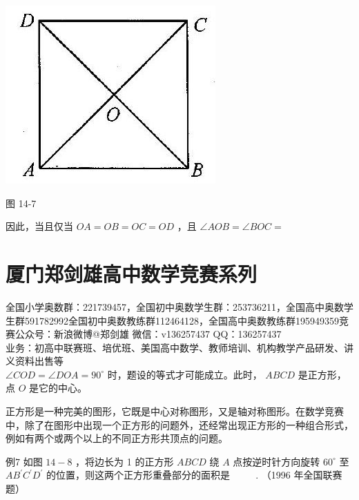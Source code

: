 \documentclass[10pt]{article}
\begin{document}
\begin{center}
\includegraphics[max width=\textwidth]{2024_10_30_2c8f45efd4a519b08e1ag-130}
\end{center}

图 14-7

因此，当且仅当 $O A=O B=O C=O D$ ，且 $\angle A O B=\angle B O C=$

\section*{厦门郑剑雄高中数学竞赛系列}
全国小学奥数群：221739457，全国初中奥数学生群：253736211，全国高中奥数学生群591782992全国初中奥数教练群112464128，全国高中奥数教练群195949359竞赛公众号：新浪微博@郑剑雄 微信：v136257437 QQ：136257437\\
业务：初高中联赛班、培优班、美国高中数学、教师培训、机构教学产品研发、讲义资料出售等\\
$\angle C O D=\angle D O A=90^{\circ}$ 时，题设的等式才可能成立。此时， $A B C D$ 是正方形，点 $O$ 是它的中心。

正方形是一种完美的图形，它既是中心对称图形，又是轴对称图形。在数学竞赛中，除了在图形中出现一个正方形的问题外，还经常出现正方形的一种组合形式，例如有两个或两个以上的不同正方形共顶点的问题。

例7 如图 $14-8$ ，将边长为 1 的正方形 $A B C D$ 绕 $A$ 点按逆时针方向旋转 $60^{\circ}$ 至 $A B^{\prime} C^{\prime} D^{\prime}$ 的位置，则这两个正方形重叠部分的面积是 $\qquad$ . （1996 年全国联赛题）
\end{document}
